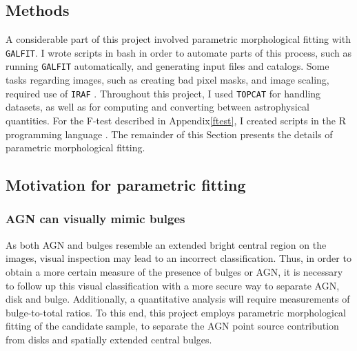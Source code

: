 \documentclass[11pt,twocolumn]{article}
\begin{document}
\subsection{\normalsize Methods}
A considerable part of this project involved parametric morphological fitting with {\tt GALFIT}.  I wrote scripts in bash in order to automate parts of this process, such as running {\tt GALFIT} automatically, and generating input files and catalogs. Some tasks regarding images, such as creating bad pixel masks, and image scaling, required use of {\tt IRAF} \cite{1993ASPC...52..173T}. Throughout this project, I used {\tt TOPCAT} \cite{2005ASPC..347...29T} for handling datasets, as well as for computing and converting  between astrophysical quantities. For the F-test described in Appendix\ref{ftest}, I created scripts in the R programming language \cite{Rprogramming}. The remainder of this Section presents the details of parametric morphological fitting. 


\subsection{\normalsize Motivation for parametric fitting}
\subsubsection{\normalsize AGN can visually mimic bulges}\label{agnbias}
As both AGN and bulges resemble an extended bright central region on the images, visual inspection may lead to an incorrect classification. Thus, in order to obtain a more certain measure of the presence of bulges or AGN, it is necessary to follow up this visual classification with a more secure way to separate AGN, disk and bulge. Additionally, a quantitative analysis will require measurements of bulge-to-total ratios. To this end, this project employs parametric morphological fitting of the candidate sample, to separate the AGN point source contribution from disks and spatially extended central bulges.



\end{document}
